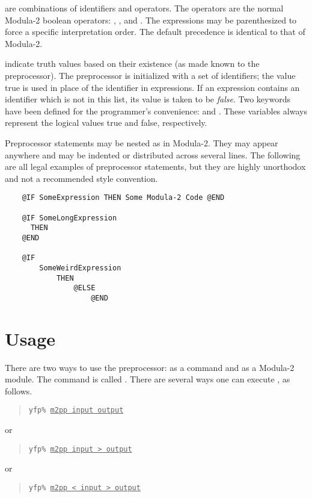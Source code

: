  are combinations of identifiers and operators.  
The operators are the normal Modula-2 boolean operators:
, , and .  The expressions may be
parenthesized to force a specific interpretation order.  The
default precedence is identical to that of Modula-2.  

 indicate truth values based on their existence
(as made known to the preprocessor).  The preprocessor is initialized
with a set of  identifiers; the value true
is used in place of the identifier in expressions.
If an expression contains an identifier which is not in this list,
its value is taken to be {\em false}.
Two keywords have been defined for the programmer's convenience:
 and .
These variables always represent the logical values true and false, 
respectively.

Preprocessor statements may be nested as in Modula-2.  They may
appear anywhere and may be indented or distributed across several
lines.  The following are all legal examples of preprocessor statements,
but they are highly unorthodox and not a recommended style convention.
\begin{verbatim}
    @IF SomeExpression THEN Some Modula-2 Code @END

    @IF SomeLongExpression
      THEN
    @END

    @IF
        SomeWeirdExpression
            THEN
                @ELSE
                    @END
\end{verbatim}


\section{Usage}

There are two ways to use the preprocessor: as a command
and as a Modula-2 module.  The command is called .
There are several ways one can execute , as follows.

\newcommand{\PromptedCommand}[1]{{\tt yfp\% \underline{#1}}}
\begin{quote}
    \PromptedCommand{m2pp input output}
\end{quote}
or
\begin{quote}
    \PromptedCommand{m2pp input > output}
\end{quote}
or
\begin{quote}
    \PromptedCommand{m2pp < input > output}
\end{quote}

